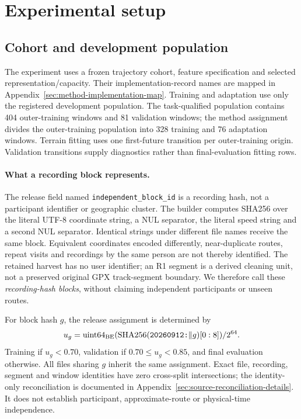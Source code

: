 \documentclass[11pt]{article}
\begin{document}
\section{Experimental setup}
\label{sec:protocol}
\subsection{Cohort and development population}
The experiment uses a frozen trajectory cohort, feature specification and
selected representation/capacity. Their implementation-record names are
mapped in Appendix~\ref{sec:method-implementation-map}. Training and
adaptation use only the registered development population. The task-qualified
population contains 404 outer-training windows and 81 validation windows;
the method assignment divides the outer-training population into 328 training
and 76 adaptation windows. Terrain fitting uses one first-future transition
per outer-training origin. Validation transitions supply diagnostics rather
than final-evaluation fitting rows.

\paragraph{What a recording block represents.}
The release field named \texttt{independent\_block\_id} is a recording hash,
not a participant identifier or geographic cluster. The builder computes
SHA256 over the literal UTF-8 coordinate string, a NUL separator, the literal
speed string and a second NUL separator. Identical strings under different
file names receive the same block. Equivalent coordinates encoded differently,
near-duplicate routes, repeat visits and recordings by the same person are
not thereby identified. The retained harvest has no user identifier; an R1
segment is a derived cleaning unit, not a preserved original GPX track-segment
boundary. We therefore call these \emph{recording-hash blocks}, without
claiming independent participants or unseen routes.

For block hash \(g\), the release assignment is determined by
\[
u_g=\operatorname{uint64}_{\rm BE}
(\operatorname{SHA256}(\texttt{20260912:}\Vert g)[0:8])/2^{64}.
\]
Training if \(u_g<0.70\), validation if \(0.70\leq u_g<0.85\), and final
evaluation otherwise. All files sharing \(g\) inherit the same assignment.
Exact file, recording, segment and window identities have zero cross-split
intersections; the identity-only reconciliation is documented in
Appendix~\ref{sec:source-reconciliation-details}. It does not establish
participant, approximate-route or physical-time independence.
\end{document}
